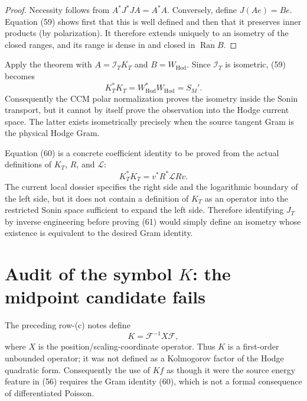 \documentclass[11pt]{article}
\newcommand{\Ran}{\operatorname{Ran}}
\newcommand{\Hod}{\mathrm{Hod}}
\newcommand{\cL}{\mathscr L}
\begin{document}
\begin{proof}
Necessity follows from $A^*J^*JA=A^*A$.  Conversely, define $J(Ae)=Be$.
Equation (59) shows first that this is well defined and then that it preserves
inner products (by polarization).  It therefore extends uniquely to an
isometry of the closed ranges, and its range is dense in and closed in
$\overline{\Ran B}$.
\end{proof}

Apply the theorem with $A=\mathcal I_TK_T$ and $B=W_{\Hod}$.  Since
$\mathcal I_T$ is isometric, (59) becomes
\begin{equation}
 \boxed{K_T^*K_T=W_{\Hod}^*W_{\Hod}=S_M'.}              \tag{60}
\end{equation}
Consequently the CCM polar normalization proves the isometry inside the Sonin
transport, but it cannot by itself prove the observation into the Hodge
current space.  The latter exists isometrically precisely when the source
tangent Gram is the physical Hodge Gram.

Equation (60) is a concrete coefficient identity to be proved from the actual
definitions of $K_T$, $R$, and $\cL$:
\begin{equation}
 \boxed{K_T^*K_T=v^*R^*\cL Rv.}                         \tag{61}
\end{equation}
The current local dossier specifies the right side and the logarithmic
boundary of the left side, but it does not contain a definition of $K_T$ as an
operator into the restricted Sonin space sufficient to expand the left side.
Therefore identifying $J_T$ by inverse engineering before proving (61) would
simply define an isometry whose existence is equivalent to the desired Gram
identity.

\section{Audit of the symbol $K$: the midpoint candidate fails}

The preceding row-(c) notes define
\begin{equation}
 K=\mathcal F^{-1}X\mathcal F,                           \tag{62}
\end{equation}
where $X$ is the position/scaling-coordinate operator.  Thus $K$ is a
first-order unbounded operator; it was not defined as a Kolmogorov factor of
the Hodge quadratic form.  Consequently the use of $Kf$ as though it were the
source energy feature in (56) requires the Gram identity (60), which is not a
formal consequence of differentiated Poisson.
\end{document}
